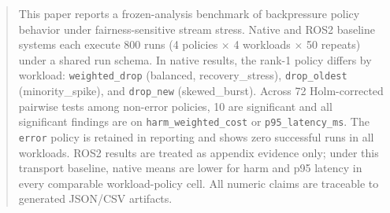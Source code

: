 \begin{abstract}
This paper reports a frozen-analysis benchmark of backpressure policy behavior under fairness-sensitive
stream stress. Native and ROS2 baseline systems each execute 800 runs
(4 policies \(\times\) 4 workloads \(\times\) 50 repeats) under a shared run schema.
In native results, the rank-1 policy differs by workload:
\texttt{weighted\_drop} (balanced, recovery\_stress),
\texttt{drop\_oldest} (minority\_spike), and
\texttt{drop\_new} (skewed\_burst).
Across 72 Holm-corrected pairwise tests among non-error policies, 10 are significant
and all significant findings are on \texttt{harm\_weighted\_cost} or \texttt{p95\_latency\_ms}.
The \texttt{error} policy is retained in reporting and shows zero successful runs in all workloads.
ROS2 results are treated as appendix evidence only; under this transport baseline, native means are lower
for harm and p95 latency in every comparable workload-policy cell.
All numeric claims are traceable to generated JSON/CSV artifacts.
\end{abstract}
